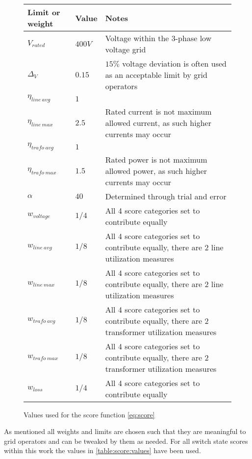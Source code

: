 \begin{figure}[H]
    \begin{tabular}{l l p{10cm}}
        Limit or weight & Value & Notes\\
        \hline
        $V_{rated}$         & $400V$ & Voltage within the 3-phase low voltage grid\\
        $\Delta_V$          & $0.15$ & $15\%$ voltage deviation is often used as an acceptable limit by grid operators\autocite{venios}\\
        $\eta_{line \ avg}$ & $1$    & \\
        $\eta_{line \ max}$ & $2.5$  & Rated current is not maximum allowed current, as such higher currents may occur\\
        $\eta_{trafo \ avg}$& $1$    & \\
        $\eta_{trafo \ max}$& $1.5$  & Rated power is not maximum allowed power, as such higher currents may occur\\
        $\alpha$            & $40$   & Determined through trial and error\\
        $w_{voltage}$       & $1/4$  & All 4 score categories set to contribute equally\\
        $w_{line \ avg}$    & $1/8$  & All 4 score categories set to contribute equally, there are 2 line utilization measures\\
        $w_{line \ max}$    & $1/8$  & All 4 score categories set to contribute equally, there are 2 line utilization measures\\
        $w_{trafo\ avg}$    & $1/8$  & All 4 score categories set to contribute equally, there are 2 transformer utilization measures\\
        $w_{trafo\ max}$    & $1/8$  & All 4 score categories set to contribute equally, there are 2 transformer utilization measures\\
        $w_{loss}$          & $1/4$  & All 4 score categories set to contribute equally
    \end{tabular}
    \caption{Values used for the score function \autoref{eq:score}}
    \label{table:score:values}
\end{figure}

As mentioned all weights and limits are chosen such that they are meaningful to grid operators
and can be tweaked by them as needed. For all switch state scores within this work the values
in \autoref{table:score:values} have been used.
